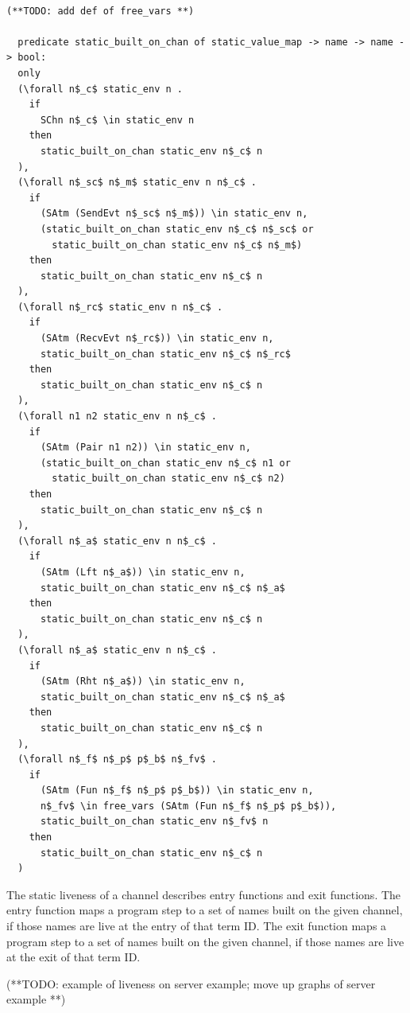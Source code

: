 \documentclass[10pt]{article}
\begin{document}
\begin{lstlisting}[language=logic, mathescape]

(**TODO: add def of free_vars **)

  predicate static_built_on_chan of static_value_map -> name -> name -> bool:
  only
  (\forall n$_c$ static_env n .
    if 
      SChn n$_c$ \in static_env n 
    then 
      static_built_on_chan static_env n$_c$ n
  ),
  (\forall n$_sc$ n$_m$ static_env n n$_c$ . 
    if
      (SAtm (SendEvt n$_sc$ n$_m$)) \in static_env n,
      (static_built_on_chan static_env n$_c$ n$_sc$ or
        static_built_on_chan static_env n$_c$ n$_m$)
    then 
      static_built_on_chan static_env n$_c$ n
  ),
  (\forall n$_rc$ static_env n n$_c$ . 
    if  
      (SAtm (RecvEvt n$_rc$)) \in static_env n,
      static_built_on_chan static_env n$_c$ n$_rc$
    then 
      static_built_on_chan static_env n$_c$ n
  ),
  (\forall n1 n2 static_env n n$_c$ . 
    if  
      (SAtm (Pair n1 n2)) \in static_env n,
      (static_built_on_chan static_env n$_c$ n1 or
        static_built_on_chan static_env n$_c$ n2)
    then 
      static_built_on_chan static_env n$_c$ n
  ),
  (\forall n$_a$ static_env n n$_c$ .
    if
      (SAtm (Lft n$_a$)) \in static_env n,
      static_built_on_chan static_env n$_c$ n$_a$
    then 
      static_built_on_chan static_env n$_c$ n
  ),
  (\forall n$_a$ static_env n n$_c$ .
    if
      (SAtm (Rht n$_a$)) \in static_env n,
      static_built_on_chan static_env n$_c$ n$_a$
    then 
      static_built_on_chan static_env n$_c$ n
  ),
  (\forall n$_f$ n$_p$ p$_b$ n$_fv$ .
    if
      (SAtm (Fun n$_f$ n$_p$ p$_b$)) \in static_env n,
      n$_fv$ \in free_vars (SAtm (Fun n$_f$ n$_p$ p$_b$)),
      static_built_on_chan static_env n$_fv$ n
    then
      static_built_on_chan static_env n$_c$ n
  )
\end{lstlisting}


The static liveness of a channel describes entry functions and exit functions.
The entry function maps a program step to a set of names built on
the given channel, if those names are live at the entry of that term ID.
The exit function maps a program step to a
set of names built on the given channel, if those names are live at the exit of that
term ID.


(**TODO:
example of liveness on server example;
move up graphs of server example 
**)
\end{document}
